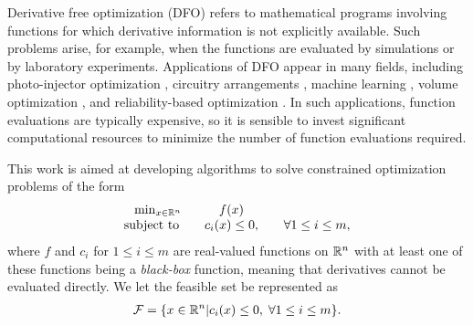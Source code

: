 

Derivative free optimization (DFO) refers to mathematical programs involving functions for which derivative information is not explicitly available.
Such problems arise, for example, when the functions are evaluated by simulations or by laboratory experiments.
Applications of DFO appear in many fields, including photo-injector optimization \cite{Neveu2017},
circuitry arrangements \cite{PLOSKAS201816}, machine learning \cite{KS2018}, volume optimization \cite{Cheng2017}, and reliability-based optimization \cite{Gao2017}.
In such applications, function evaluations are typically expensive, 
so it is sensible to invest significant computational resources to minimize the number of function evaluations required.

This work is aimed at developing algorithms to solve constrained optimization problems of the form 
\begin{align}
\begin{array}{ccl} \min_{x \in \mathbb R^n} & f(x) \\
\mbox{subject to} \quad & c_i(x) \le 0, &\quad \forall 1 \le i \le m,
\end{array}
\label{the_dfo_problem}
\end{align}
where 
$f$ and $c_i$ for $1 \le i \le m$ are real-valued functions on $\mathbb R^n$ with at least one of these functions being a {\em black-box} function, meaning that derivatives cannot be evaluated directly.
We let the feasible set be represented as
\begin{align}
{\mathcal F} = \{x \in \mathbb R^n | c_i(x) \le 0, \; \forall 1 \le i \le m \}.
\end{align}

